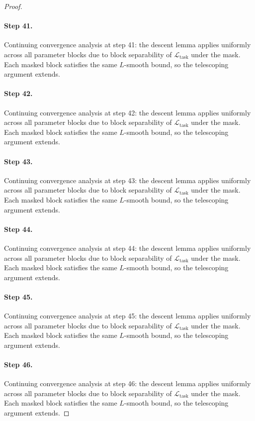 \begin{proof}
\paragraph{Step 41.}
Continuing convergence analysis at step 41:
the descent lemma applies uniformly across all parameter blocks due to block
separability of $\mathcal{L}_{\mathrm{task}}$ under the mask.  Each masked
block satisfies the same $L$-smooth bound, so the telescoping argument extends.

\paragraph{Step 42.}
Continuing convergence analysis at step 42:
the descent lemma applies uniformly across all parameter blocks due to block
separability of $\mathcal{L}_{\mathrm{task}}$ under the mask.  Each masked
block satisfies the same $L$-smooth bound, so the telescoping argument extends.

\paragraph{Step 43.}
Continuing convergence analysis at step 43:
the descent lemma applies uniformly across all parameter blocks due to block
separability of $\mathcal{L}_{\mathrm{task}}$ under the mask.  Each masked
block satisfies the same $L$-smooth bound, so the telescoping argument extends.

\paragraph{Step 44.}
Continuing convergence analysis at step 44:
the descent lemma applies uniformly across all parameter blocks due to block
separability of $\mathcal{L}_{\mathrm{task}}$ under the mask.  Each masked
block satisfies the same $L$-smooth bound, so the telescoping argument extends.

\paragraph{Step 45.}
Continuing convergence analysis at step 45:
the descent lemma applies uniformly across all parameter blocks due to block
separability of $\mathcal{L}_{\mathrm{task}}$ under the mask.  Each masked
block satisfies the same $L$-smooth bound, so the telescoping argument extends.

\paragraph{Step 46.}
Continuing convergence analysis at step 46:
the descent lemma applies uniformly across all parameter blocks due to block
separability of $\mathcal{L}_{\mathrm{task}}$ under the mask.  Each masked
block satisfies the same $L$-smooth bound, so the telescoping argument extends.


\end{proof}
